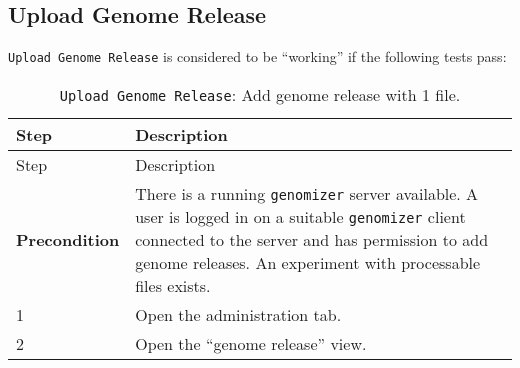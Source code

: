 \pagebreak

\subsection{Upload Genome Release}\label{upload-genome-release}

\texttt{Upload\ Genome\ Release} is considered to be ``working'' if the
following tests pass:

\begin{longtable}[c]{@{}ll@{}}
\caption{\texttt{Upload\ Genome\ Release}: Add genome release with 1
file.}\tabularnewline
\toprule
\begin{minipage}[b]{0.31\columnwidth}\raggedright\strut
Step
\strut\end{minipage} &
\begin{minipage}[b]{0.63\columnwidth}\raggedright\strut
Description
\strut\end{minipage}\tabularnewline
\midrule
\endfirsthead
\toprule
\begin{minipage}[b]{0.31\columnwidth}\raggedright\strut
Step
\strut\end{minipage} &
\begin{minipage}[b]{0.63\columnwidth}\raggedright\strut
Description
\strut\end{minipage}\tabularnewline
\midrule
\endhead
\begin{minipage}[t]{0.31\columnwidth}\raggedright\strut
\textbf{Precondition}
\strut\end{minipage} &
\begin{minipage}[t]{0.63\columnwidth}\raggedright\strut
There is a running \texttt{genomizer} server available. A user is logged
in on a suitable \texttt{genomizer} client connected to the server and
has permission to add genome releases. An experiment with processable
files exists.
\strut\end{minipage}\tabularnewline
\begin{minipage}[t]{0.31\columnwidth}\raggedright\strut
1
\strut\end{minipage} &
\begin{minipage}[t]{0.63\columnwidth}\raggedright\strut
Open the administration tab.
\strut\end{minipage}\tabularnewline
\begin{minipage}[t]{0.31\columnwidth}\raggedright\strut
2
\strut\end{minipage} &
\begin{minipage}[t]{0.63\columnwidth}\raggedright\strut
Open the ``genome release'' view.

\end{minipage}
\end{longtable}
